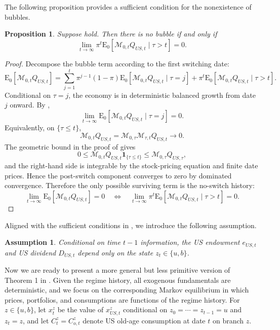 \documentclass[12pt]{article}
\theoremstyle{plain}
\newtheorem{ass}{Assumption}
\newtheorem{prop}{Proposition}
\begin{document}
The following proposition provides a sufficient condition for the nonexistence of bubbles.

\begin{prop}\label{prop2}
Suppose  hold. Then there is no bubble if and only if
\[
\lim _{t \rightarrow \infty} \pi^t \mathrm{E}_0\left[\mathcal{M}_{0,t} Q_{US,t} \mid \tau>t\right]=0.
\]
\end{prop}

\begin{proof}
Decompose the bubble term according to the first switching date:
\[
\mathrm{E}_0\left[\mathcal{M}_{0 , t} Q_{US,t}\right]
=
\sum_{j=1}^t \pi^{j-1}(1-\pi)
\mathrm{E}_0\left[\mathcal{M}_{0,t} Q_{US,t} \mid \tau=j\right]
+\pi^t \mathrm{E}_0\left[\mathcal{M}_{0, t} Q_{US,t} \mid \tau>t\right].
\]
Conditional on $\tau=j$, the economy is in deterministic balanced growth from
date $j$ onward. By ,
\[
\lim_{t\to\infty}
\mathrm{E}_0\left[\mathcal M_{0,t}Q_{US,t}\mid \tau=j\right]=0.
\]
Equivalently, on $\{\tau\le t\}$,
\[
\mathcal M_{0,t}Q_{US,t}
=
\mathcal M_{0,\tau}\mathcal M_{\tau,t}Q_{US,t}
\to0.
\]
The geometric bound in the proof of  gives
\[
0\le
\mathcal M_{0,t}Q_{US,t}\mathbf 1_{\{\tau\le t\}}
\le
\mathcal M_{0,\tau}Q_{US,\tau},
\]
and the right-hand side is integrable by the stock-pricing equation and finite
date prices. Hence the post-switch component converges to zero by dominated
convergence. Therefore the only possible surviving term is the no-switch
history:
\[
\lim_{t\to\infty}\mathrm{E}_0\left[\mathcal M_{0,t}Q_{US,t}\right]=0
\quad\Longleftrightarrow\quad
\lim_{t\to\infty}
\pi^t \mathrm{E}_0\left[\mathcal M_{0,t}Q_{US,t}\mid \tau>t\right]=0.
\]
\end{proof}

Aligned with the sufficient conditions in , we introduce the following assumption.

\begin{ass}\label{ass_switch_dependence}
Conditional on time $t-1$ information, the US endowment $e_{US,t}$ and US dividend $D_{US,t}$ depend only on the state
$z_t \in \{u,b\}$.
\end{ass}


Now we are ready to present a more general but less primitive version of Theorem 1 in \citet{hirano2025technological}.
Given the regime history, all exogenous fundamentals are deterministic, and we
focus on the corresponding Markov equilibrium in which prices, portfolios, and
consumptions are functions of the regime history.
For $z\in\{u,b\}$, let $x_t^z$ be the value of $x_{US,t}^z$ conditional on $z_0=\cdots=z_{t-1}=u$ and $z_t=z$,
and let $C_t^z=C_{o,t}^z$ denote US old-age consumption at date $t$ on branch $z$.
\end{document}
